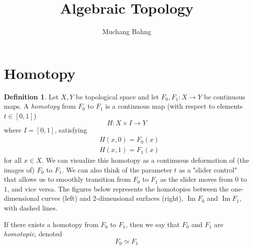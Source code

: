 \documentclass{article}
\DeclareMathOperator{\im}{Im}
\theoremstyle{remark}
\theoremstyle{definition}
\newtheorem{definition}{Definition}[section]
\begin{document}
\pagestyle{fancy}

\cfoot{\thepage / \pageref{LastPage}}

\title{Algebraic Topology}
\author{Muchang Bahng}

\maketitle

\section{Homotopy}
\begin{definition}
Let $X, Y$ be topological space and let $F_0, F_1: X \longrightarrow Y$ be continuous maps. A \textit{homotopy} from $F_0$ to $F_1$ is a continuous map (with respect to elements $t \in [0,1]$)
\[H: X \times I \longrightarrow Y\]
where $I = [0,1]$, satisfying
\begin{align*}
    & H(x, 0) = F_0 (x) \\
    & H(x, 1) = F_1 (x) 
\end{align*}
for all $x \in X$. We can visualize this homotopy as a continuous deformation of (the images of) $F_0$ to $F_1$. We can also think of the parameter $t$ as a "slider control" that allows us to smoothly transition from $F_0$ to $F_1$ as the slider moves from $0$ to $1$, and vice versa. The figures below represents the homotopies between the one-dimensional curves (left) and 2-dimensional surfaces (right), $\im{F_0}$ and $\im{F_1}$, with dashed lines. 
\begin{center}
\end{center}
If there exists a homotopy from $F_0$ to $F_1$, then we say that $F_0$ and $F_1$ are \textit{homotopic}, denoted
\[F_0 \simeq F_1\]
\end{definition}
\end{document}

